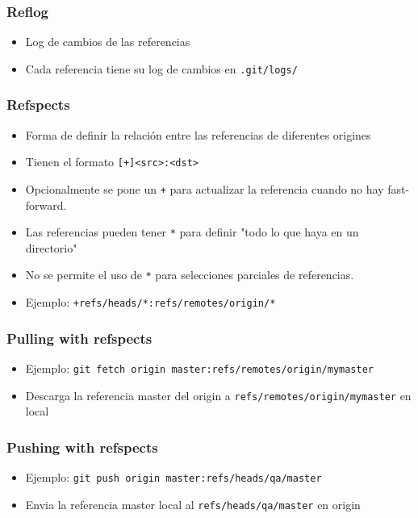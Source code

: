 \documentclass[10pt]{beamer}
\begin{document}
  \begin{frame}[containsverbatim]
    \frametitle{Reflog}
    \begin{itemize}
        \item Log de cambios de las referencias
        \item Cada referencia tiene su log de cambios en \verb+.git/logs/+
    \end{itemize}
  \end{frame}

  \begin{frame}[containsverbatim]
    \frametitle{Refspects}
    \begin{itemize}
        \item Forma de definir la relación entre las referencias de diferentes origines
        \item Tienen el formato \verb$[+]<src>:<dst>$
        \item Opcionalmente se pone un \verb$+$ para actualizar la referencia cuando no hay fast-forward.
        \item Las referencias pueden tener \verb$*$ para definir "todo lo que haya en un directorio"
        \item No se permite el uso de \verb$*$ para selecciones parciales de referencias.
        \item Ejemplo: \verb$+refs/heads/*:refs/remotes/origin/*$
    \end{itemize}
  \end{frame}

  \begin{frame}[containsverbatim]
    \frametitle{Pulling with refspects}
    \begin{itemize}
        \item Ejemplo: \verb$git fetch origin master:refs/remotes/origin/mymaster$
        \item Descarga la referencia master del origin a \verb$refs/remotes/origin/mymaster$ en local
    \end{itemize}
  \end{frame}

  \begin{frame}[containsverbatim]
    \frametitle{Pushing with refspects}
    \begin{itemize}
        \item Ejemplo: \verb$git push origin master:refs/heads/qa/master$
        \item Envia la referencia master local al \verb$refs/heads/qa/master$ en origin
    \end{itemize}
  \end{frame}
\end{document}
